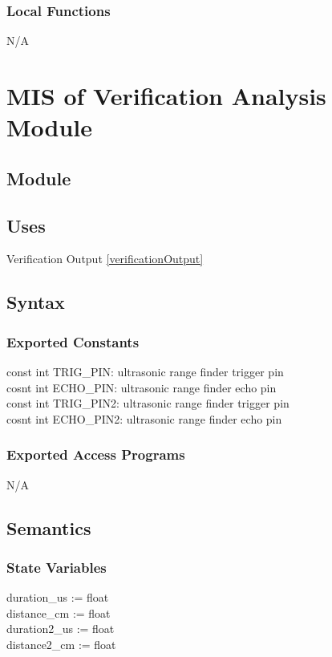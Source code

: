 \documentclass[12pt, titlepage]{article}
\begin{document}
\subsubsection{Local Functions}

N/A

\section{MIS of Verification Analysis Module} \label{verificationAnalysis} 

\subsection{Module}

\subsection{Uses}

Verification Output \ref{verificationOutput}
\subsection{Syntax}

\subsubsection{Exported Constants}
const int TRIG\_PIN: ultrasonic range finder trigger pin\\
cosnt int ECHO\_PIN: ultrasonic range finder echo pin\\
const int TRIG\_PIN2: ultrasonic range finder trigger pin\\
cosnt int ECHO\_PIN2: ultrasonic range finder echo pin\\
\subsubsection{Exported Access Programs}

N/A

\subsection{Semantics}

\subsubsection{State Variables}

duration\_us := float\\
distance\_cm := float\\
duration2\_us := float\\
distance2\_cm := float\\
\end{document}

